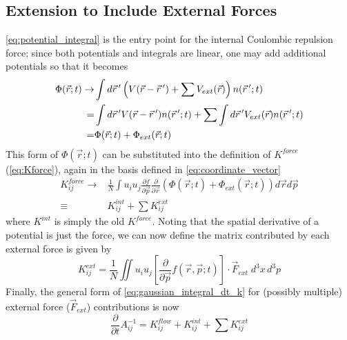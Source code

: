 
\subsection{Extension to Include External Forces} \label{sec:external_forces}

\ref{eq:potential_integral} is the entry point for the internal Coulombic repulsion force; since both potentials and integrals are linear, one may add additional potentials so that it becomes
\begin{equation}
  \begin{split}
    \Phi(\vec{r};t) \rightarrow & \int d\vec{r}\,^{\prime} \left( V(\vec{r} - \vec{r}\,^{\prime}) + \sum V_{ext}(\vec{r}) \right) n(\vec{r}\,^{\prime}; t) \\
    = & \int d\vec{r}\,^{\prime} V(\vec{r} - \vec{r}\,^{\prime}) n(\vec{r}\,^{\prime}; t) + \sum \int d\vec{r}\,^{\prime} V_{ext}(\vec{r}) n(\vec{r}\,^{\prime}; t) \\
    = & \Phi(\vec{r};t) + \Phi_{ext}(\vec{r};t)
  \end{split}
\end{equation}
This form of $\Phi(\vec{r};t)$ can be substituted into the definition of $K^{force}$ (\ref{eq:Kforce}), again in the basis defined in \ref{eq:coordinate_vector} 
\begin{equation}
  \begin{split}
    K^{force}_{ij} \rightarrow & \frac{1}{N} \int u_i u_j \frac{\partial f}{\partial \vec{p}} \frac{\partial}{\partial \vec{r}} \left( \Phi(\vec{r};t) + \Phi_{ext}(\vec{r};t) \right) d\vec{r} d\vec{p} \\
    \equiv & K^{int}_{ij} + \sum K^{ext}_{ij}
  \end{split}
\end{equation}
where $K^{int}$ is simply the old $K^{force}$. Noting that the spatial derivative of a potential is just the force, we can now define the matrix contributed by each external force is given by
\begin{equation}
  K^{ext}_{ij} = \frac{1}{N} \iint u_i u_j \left [ \frac{\partial}{\partial \vec{p}} f(\vec{r}, \vec{p}; t) \right ] \cdot \vec{F}_{ext}\;d^{3}x\,d^{3}p
\end{equation}
Finally, the general form of \ref{eq:gaussian_integral_dt_k} for (possibly multiple) external force ($\vec{F}_{ext}$) contributions is now
\begin{equation}
  \frac{\partial}{\partial t} A^{-1}_{ij} = K^{flow}_{ij} + K^{int}_{ij} + \sum K^{ext}_{ij}
\end{equation}

